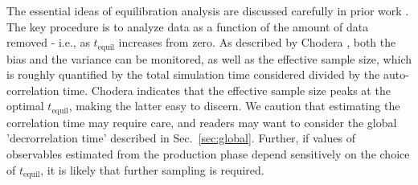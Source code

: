 The essential ideas of equilibration analysis are discussed carefully in prior work \cite{Yang2004,Chodera-2016}.
The key procedure is to analyze data as a function of the amount of data removed - i.e., as $t_{\mathrm{equil}}$ increases from zero.
As described by Chodera \cite{Chodera-2016}, both the bias and the variance can be monitored, as well as the effective sample size, which is roughly quantified by the total simulation time considered divided by the auto-correlation time.
Chodera indicates that the effective sample size peaks at the optimal $t_{\mathrm{equil}}$, making the latter easy to discern.
We caution that estimating the correlation time may require care, and readers may want to consider the global 'decrorrelation time' \cite{Lyman2007a} described in Sec.\ \ref{sec:global}.
Further, if values of observables estimated from the production phase depend sensitively on the choice of $t_{\mathrm{equil}}$, it is likely that further sampling is required.
